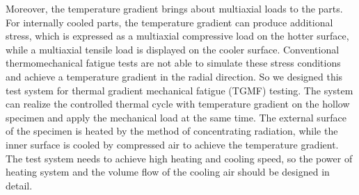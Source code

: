 Moreover, the temperature gradient brings about multiaxial loads to the parts.
For internally cooled parts, the temperature gradient can produce additional stress, which is expressed as a multiaxial compressive load on the hotter surface, while a multiaxial tensile load is displayed on the cooler surface.
Conventional thermomechanical fatigue tests are not able to simulate these stress conditions and achieve a temperature gradient in the radial direction. So we designed this test system for thermal gradient mechanical fatigue (TGMF) testing.
The system can realize the controlled thermal cycle with temperature gradient on the hollow specimen and apply the mechanical load at the same time.
The external surface of the specimen is heated by the method of concentrating radiation, while the inner surface is cooled by compressed air to achieve the temperature gradient.
The test system needs to achieve high heating and cooling speed, so the power of heating system and the volume flow of the cooling air should be designed in detail.


%



